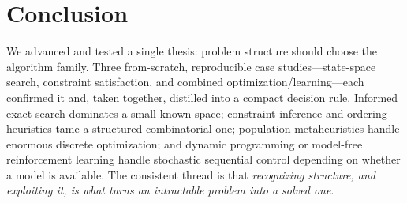 \documentclass[10pt]{article}
\begin{document}
\section{Conclusion}
We advanced and tested a single thesis: problem structure should choose the
algorithm family. Three from-scratch, reproducible case studies---state-space
search, constraint satisfaction, and combined optimization/learning---each
confirmed it and, taken together, distilled into a compact decision rule.
Informed exact search dominates a small known space; constraint inference and
ordering heuristics tame a structured combinatorial one; population metaheuristics
handle enormous discrete optimization; and dynamic programming or model-free
reinforcement learning handle stochastic sequential control depending on whether a
model is available. The consistent thread is that \emph{recognizing structure, and
exploiting it, is what turns an intractable problem into a solved one}.
\end{document}
